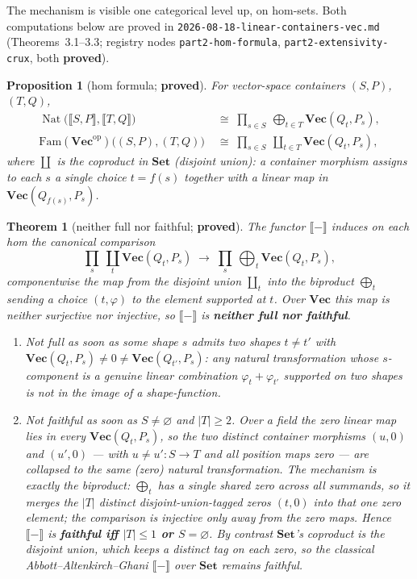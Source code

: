 \documentclass[11pt]{article}
\theoremstyle{plain}
\newtheorem{theorem}{Theorem}
\newtheorem{proposition}{Proposition}
\theoremstyle{definition}
\theoremstyle{remark}
\newcommand{\Set}{\mathbf{Set}}
\newcommand{\Vect}{\mathbf{Vec}}
\newcommand{\Fam}{\mathrm{Fam}}
\newcommand{\ext}[1]{\llbracket #1 \rrbracket}
\newcommand{\op}{\mathrm{op}}
\DeclareMathOperator{\Nat}{Nat}
\begin{document}
The mechanism is visible one categorical level up, on hom-sets. Both computations below are proved
in \texttt{2026-08-18-linear-containers-vec.md} (Theorems~3.1--3.3; registry nodes
\texttt{part2-hom-formula}, \texttt{part2-extensivity-crux}, both \textbf{proved}).

\begin{proposition}[hom formula; \textbf{proved}]
\label{prop:hom}
For vector-space containers $(S,P)$, $(T,Q)$,
\begin{align*}
  \Nat\bigl(\ext{S,P},\ext{T,Q}\bigr)&\;\cong\;\prod_{s\in S}\ \bigoplus_{t\in T}\Vect(Q_t,P_s),\\
  \Fam(\Vect^\op)\bigl((S,P),(T,Q)\bigr)&\;\cong\;\prod_{s\in S}\ \coprod_{t\in T}\Vect(Q_t,P_s),
\end{align*}
where $\coprod$ is the coproduct in $\Set$ (disjoint union): a container morphism assigns to each
$s$ a single choice $t=f(s)$ together with a linear map in $\Vect(Q_{f(s)},P_s)$.
\end{proposition}

\begin{theorem}[neither full nor faithful; \textbf{proved}]
\label{thm:notfull}
The functor $\ext{-}$ induces on each hom the canonical comparison
\[
   \prod_{s}\ \coprod_{t}\Vect(Q_t,P_s)\;\longrightarrow\;\prod_{s}\ \bigoplus_{t}\Vect(Q_t,P_s),
\]
componentwise the map from the disjoint union $\coprod_t$ into the biproduct $\bigoplus_t$ sending a
choice $(t,\varphi)$ to the element supported at $t$. Over $\Vect$ this map is \emph{neither
surjective nor injective}, so $\ext{-}$ is \textbf{neither full nor faithful}.
\begin{enumerate}
\item \emph{Not full} as soon as some shape $s$ admits two shapes $t\neq t'$ with
$\Vect(Q_t,P_s)\neq0\neq\Vect(Q_{t'},P_s)$: any natural transformation whose $s$-component is a
genuine linear combination $\varphi_t+\varphi_{t'}$ supported on two shapes is not in the image of a
shape-function.
\item \emph{Not faithful} as soon as $S\neq\varnothing$ and $|T|\geq2$. Over a field the zero linear
map lies in every $\Vect(Q_t,P_s)$, so the two \emph{distinct} container morphisms $(u,0)$ and
$(u',0)$ --- with $u\neq u'\colon S\to T$ and all position maps zero --- are collapsed to the
\emph{same} (zero) natural transformation. The mechanism is exactly the biproduct: $\bigoplus_t$ has a
single shared zero across all summands, so it merges the $|T|$ distinct disjoint-union-tagged zeros
$(t,0)$ into that one zero element; the comparison is injective only \emph{away from the zero maps}.
Hence $\ext{-}$ is \textbf{faithful iff $|T|\leq1$ or $S=\varnothing$}. By contrast $\Set$'s coproduct
is the disjoint union, which keeps a distinct tag on each zero, so the classical
Abbott--Altenkirch--Ghani $\ext{-}$ over $\Set$ remains faithful.
\end{enumerate}
\end{theorem}
\end{document}
